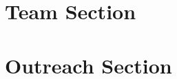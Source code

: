 \documentclass[11pt,fleqn]{book} %
\begin{document}


\part{Team Section}



\part{Outreach Section}
\end{document}

